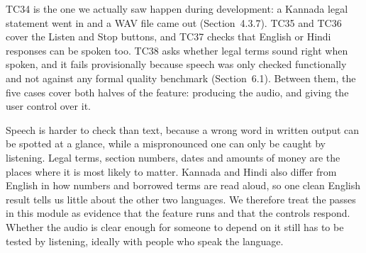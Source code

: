 \documentclass[12pt,a4paper,oneside]{report}
\begin{document}
TC34 is the one we actually saw happen during development: a Kannada legal statement went in and a WAV file came out (Section~4.3.7). TC35 and TC36 cover the Listen and Stop buttons, and TC37 checks that English or Hindi responses can be spoken too. TC38 asks whether legal terms sound right when spoken, and it fails provisionally because speech was only checked functionally and not against any formal quality benchmark (Section~6.1). Between them, the five cases cover both halves of the feature: producing the audio, and giving the user control over it. 

Speech is harder to check than text, because a wrong word in written output can be spotted at a glance, while a mispronounced one can only be caught by listening. Legal terms, section numbers, dates and amounts of money are the places where it is most likely to matter. Kannada and Hindi also differ from English in how numbers and borrowed terms are read aloud, so one clean English result tells us little about the other two languages. We therefore treat the passes in this module as evidence that the feature runs and that the controls respond. Whether the audio is clear enough for someone to depend on it still has to be tested by listening, ideally with people who speak the language.

\end{document}

